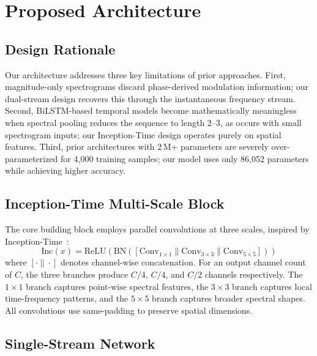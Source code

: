\documentclass[conference]{IEEEtran}
\begin{document}
\section{Proposed Architecture}
\label{sec:arch}

\subsection{Design Rationale}

Our architecture addresses three key limitations of prior approaches. First, magnitude-only spectrograms discard phase-derived modulation information; our dual-stream design recovers this through the instantaneous frequency stream. Second, BiLSTM-based temporal models become mathematically meaningless when spectral pooling reduces the sequence to length 2--3, as occurs with small spectrogram inputs; our Inception-Time design operates purely on spatial features. Third, prior architectures with 2\,M+ parameters are severely over-parameterized for 4,000 training samples; our model uses only 86,052 parameters while achieving higher accuracy.

\subsection{Inception-Time Multi-Scale Block}

The core building block employs parallel convolutions at three scales, inspired by Inception-Time~\cite{fawaz2020inceptiontime}:
\begin{equation}\label{eq:inception}
\text{Inc}(x) = \text{ReLU}\!\left(\text{BN}\!\left([\text{Conv}_{1\!\times\!1}\!\| \text{Conv}_{3\!\times\!3}\!\| \text{Conv}_{5\!\times\!5}]\right)\right)
\end{equation}
where $[\cdot \| \cdot]$ denotes channel-wise concatenation. For an output channel count of $C$, the three branches produce $C/4$, $C/4$, and $C/2$ channels respectively. The $1{\times}1$ branch captures point-wise spectral features, the $3{\times}3$ branch captures local time-frequency patterns, and the $5{\times}5$ branch captures broader spectral shapes. All convolutions use same-padding to preserve spatial dimensions.

\subsection{Single-Stream Network}
\end{document}
